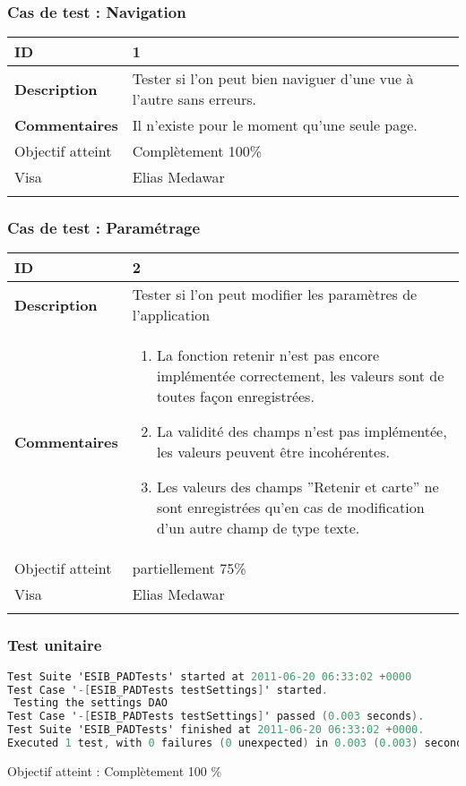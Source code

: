 		\subsubsection*{Cas de test : Navigation}
				 \begin{longtable}{m{4cm}|p{10cm}|}
				 \textbf{ ID} & 1 \\
				 \hline \textbf{Description} & Tester si l'on peut bien naviguer d'une vue à l'autre sans erreurs.\\
				 \hline \textbf{Commentaires} &Il n'existe pour le moment qu'une seule page. \\
				 \hline Objectif  atteint & {\color{green} Complètement 100\% \CheckedBox } \\
				\hline Visa & Elias Medawar \\	
				 \\
			 \end{longtable} 
 		\subsubsection*{Cas de test : Paramétrage}
		 \begin{longtable}{m{4cm}|p{10cm}|}
		 \textbf{ ID} & 2 \\
		 \hline \textbf{Description} & Tester si l'on peut modifier les paramètres de l'application\\
		 \hline \textbf{Commentaires} & 
		 	 	 \begin{enumerate}
				  		\item La fonction retenir n'est pas encore implémentée correctement, les valeurs sont de toutes façon enregistrées.
				  		\item La validité des champs n'est pas implémentée, les valeurs peuvent être incohérentes.
				  		\item Les valeurs des champs ''Retenir et carte'' ne sont enregistrées qu'en cas de modification d'un autre champ de type texte.
				  	\end{enumerate} \\
 				\hline Objectif atteint &  {\color{red}partiellement 75\% \XBox} \\
 				\hline Visa & Elias Medawar 	\\
		 \\
		 \end{longtable} 
		 \subsubsection*{Test unitaire}
		 \begin{lstlisting}[language=C,caption = Log des test unitaires]
Test Suite 'ESIB_PADTests' started at 2011-06-20 06:33:02 +0000
Test Case '-[ESIB_PADTests testSettings]' started.
 Testing the settings DAO
Test Case '-[ESIB_PADTests testSettings]' passed (0.003 seconds).
Test Suite 'ESIB_PADTests' finished at 2011-06-20 06:33:02 +0000.
Executed 1 test, with 0 failures (0 unexpected) in 0.003 (0.003) seconds
		 \end{lstlisting}
		Objectif atteint : {\color{green}Complètement 100 \% \CheckedBox}

